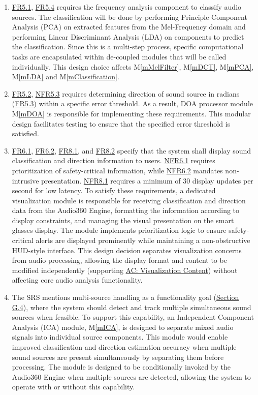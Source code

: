 \documentclass[12pt, titlepage]{article}
\newcommand{\mref}[1]{M\ref{#1}}
\begin{document}
\begin{enumerate}
\item \hyperref[SRS-FR5_1]{FR5.1}, \hyperref[SRS-FR5_4]{FR5.4} requires the
  frequency analysis component to classify audio sources. The classification
  will be done by performing Principle Component Analysis (PCA) on extracted
  features from the Mel-Frequency domain and performing Linear Discriminant
  Analysis (LDA) on components to predict the classification. Since this is a
  multi-step process, specific computational tasks are encapsulated within
  de-coupled modules that will be called individually. This design choice
  affects \mref{mMelFilter}, \mref{mDCT}, \mref{mPCA}, \mref{mLDA} and
  \mref{mClassification}. 

\item \hyperref[SRS-FR5_2]{FR5.2}, \hyperref[SRS-NFR5_3]{NFR5.3} requires
  determining direction of sound source in radians (\hyperref[SRS-FR5_3]{FR5.3})
  within a specific error threshold. As a result, DOA processor module
  \mref{mDOA} is responsible for implementing these requirements. This modular
  design facilitates testing to ensure that the specified error threshold is
  satisfied.

\item \hyperref[SRS-FR6_1]{FR6.1}, \hyperref[SRS-FR6_2]{FR6.2},
  \hyperref[SRS-FR8_1]{FR8.1}, and \hyperref[SRS-FR8_2]{FR8.2} specify that the
  system shall display sound classification and direction information to users.
  \hyperref[SRS-NFR6_1]{NFR6.1} requires prioritization of safety-critical
  information, while \hyperref[SRS-NFR6_2]{NFR6.2} mandates non-intrusive
  presentation. \hyperref[SRS-NFR8_1]{NFR8.1} requires a minimum of 30 display
  updates per second for low latency. To satisfy these requirements, a dedicated
  visualization module is responsible for receiving classification and direction
  data from the Audio360 Engine, formatting the information according to display
  constraints, and managing the visual presentation on the smart glasses
  display. The module implements prioritization logic to ensure safety-critical
  alerts are displayed prominently while maintaining a non-obstructive HUD-style
  interface. This design decision separates visualization concerns from audio
  processing, allowing the display format and content to be modified
  independently (supporting \hyperref[acVizContent]{AC: Visualization Content})
  without affecting core audio analysis functionality.

\item The SRS mentions multi-source handling as a functionality goal
  (\hyperref[SRS-sec:g4]{Section G.4}), where the system should detect and track
  multiple simultaneous sound sources when feasible. To support this capability,
  an Independent Component Analysis (ICA) module, \mref{mICA}, is designed to
  separate mixed audio signals into individual source components. This module
  would enable improved classification and direction estimation accuracy when
  multiple sound sources are present simultaneously by separating them before
  processing. The module is designed to be conditionally invoked by the Audio360
  Engine when multiple sources are detected, allowing the system to operate with
  or without this capability.
\end{enumerate}
\end{document}
